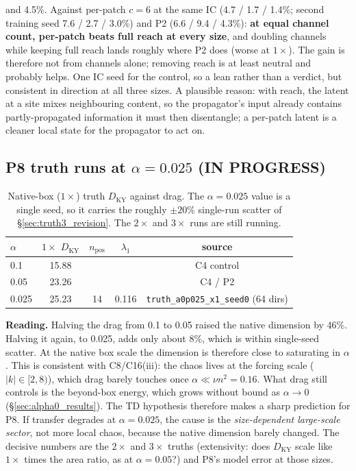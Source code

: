 \documentclass[11pt]{article}
\begin{document}
\begin{enumerate}[leftmargin=*]
  and 4.5\%. Against per-patch $c{=}6$ at the same IC (4.7 / 1.7 / 1.4\%;
  second training seed 7.6 / 2.7 / 3.0\%) and P2 (6.6 / 9.4 / 4.3\%):
  \textbf{at equal channel count, per-patch beats full reach at every
  size}, and doubling channels while keeping full reach lands roughly
  where P2 does (worse at $1\times$). The gain is therefore not from
  channels alone; removing reach is at least neutral and probably
  helps. One IC seed for the control, so a lean rather than a verdict,
  but consistent in direction at all three sizes. A plausible reason:
  with reach, the latent at a site mixes neighbouring content, so the
  propagator's input already contains partly-propagated information it
  must then disentangle; a per-patch latent is a cleaner local state for
  the propagator to act on.
\end{enumerate}

\subsection{P8 truth runs at $\alpha{=}0.025$ (IN PROGRESS)}
\label{sec:p8_truths}

\begin{table}[h]
\centering
\small
\begin{tabular}{lcccc}
\toprule
$\alpha$ & $1\times$ $D_{\mathrm{KY}}$ & $n_{\mathrm{pos}}$ & $\lambda_1$ & source \\
\midrule
0.1 & 15.88 & & & C4 control \\
0.05 & 23.26 & & & C4 / P2 \\
0.025 & 25.23 & 14 & 0.116 & \texttt{truth\_a0p025\_x1\_seed0} (64 dirs) \\
\bottomrule
\end{tabular}
\caption{Native-box ($1\times$) truth $D_{\mathrm{KY}}$ against drag.
The $\alpha{=}0.025$ value is a single seed, so it carries the roughly
$\pm20\%$ single-run scatter of \S\ref{sec:truth3_revision}. The
$2\times$ and $3\times$ runs are still running.}
\label{tab:p8_truth_x1}
\end{table}

\textbf{Reading.} Halving the drag from 0.1 to 0.05 raised the native
dimension by 46\%. Halving it again, to 0.025, adds only about 8\%,
which is within single-seed scatter. At the native box scale the
dimension is therefore close to saturating in $\alpha$. This is
consistent with C8/C16(iii): the chaos lives at the forcing scale
($|k|\in[2,8)$), which drag barely touches once $\alpha\ll\nu n^2=0.16$.
What drag still controls is the beyond-box energy, which grows without
bound as $\alpha\to0$ (\S\ref{sec:alpha0_results}). The TD hypothesis
therefore makes a sharp prediction for P8. If transfer degrades at
$\alpha{=}0.025$, the cause is the \emph{size-dependent large-scale
sector}, not more local chaos, because the native dimension barely
changed. The decisive numbers are the $2\times$ and $3\times$ truths
(extensivity: does $D_{\mathrm{KY}}$ scale like $1\times$ times the area
ratio, as at $\alpha{=}0.05$?) and P8's model error at those sizes.
\end{document}
